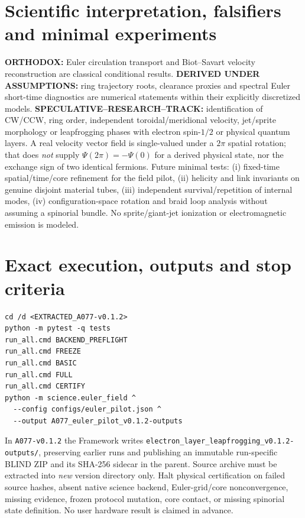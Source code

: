 \documentclass[10pt,a4paper]{article}
\begin{document}
\section{Scientific interpretation, falsifiers and minimal experiments}
\textbf{ORTHODOX:} Euler circulation transport and Biot--Savart velocity reconstruction are classical conditional results. \textbf{DERIVED UNDER ASSUMPTIONS:} ring trajectory roots, clearance proxies and spectral Euler short-time diagnostics are numerical statements within their explicitly discretized models. \textbf{SPECULATIVE--RESEARCH--TRACK:} identification of CW/CCW, ring order, independent toroidal/meridional velocity, jet/sprite morphology or leapfrogging phases with electron spin-$1/2$ or physical quantum layers. A real velocity vector field is single-valued under a $2\pi$ spatial rotation; that does \emph{not} supply $\Psi(2\pi)=-\Psi(0)$ for a derived physical state, nor the exchange sign of two identical fermions. Future minimal tests: (i) fixed-time spatial/time/core refinement for the field pilot, (ii) helicity and link invariants on genuine disjoint material tubes, (iii) independent survival/repetition of internal modes, (iv) configuration-space rotation and braid loop analysis without assuming a spinorial bundle. No sprite/giant-jet ionization or electromagnetic emission is modeled.

\section{Exact execution, outputs and stop criteria}
\begin{verbatim}
cd /d <EXTRACTED_A077-v0.1.2>
python -m pytest -q tests
run_all.cmd BACKEND_PREFLIGHT
run_all.cmd FREEZE
run_all.cmd BASIC
run_all.cmd FULL
run_all.cmd CERTIFY
python -m science.euler_field ^
  --config configs/euler_pilot.json ^
  --output A077_euler_pilot_v0.1.2-outputs
\end{verbatim}
In \texttt{A077-v0.1.2} the Framework writes \texttt{electron\_layer\_leapfrogging\_v0.1.2-outputs/}, preserving earlier runs and publishing an immutable run-specific BLIND ZIP and its SHA-256 sidecar in the parent. Source archive must be extracted into \emph{new} version directory only. Halt physical certification on failed source hashes, absent native science backend, Euler-grid/core nonconvergence, missing evidence, frozen protocol mutation, core contact, or missing spinorial state definition. No user hardware result is claimed in advance.
\end{document}
